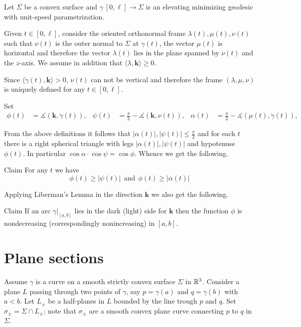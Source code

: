 \documentclass[a4paper,10pt]{amsart}
\begin{document}
Let $\Sigma$ be a convex surface 
and $\gamma\:[0,\ell]\to \Sigma$ is an elevating minimizing geodesic 
with unit-speed parametrization.

Given $t\in [0,\ell]$, 
consider the oriented orthonormal frame $\lambda(t),\mu(t),\nu(t)$ 
such that $\nu(t)$ is the outer normal to $\Sigma$ at $\gamma(t)$,
the vector $\mu(t)$ is horizontal and therefore the vector $\lambda(t)$ lies in the plane spanned by $\nu(t)$ and the $z$-axis.
We assume in addition that $\langle\lambda,\bm{k}\rangle\ge 0$.

Since $\langle\dot\gamma(t),\bm{k}\rangle>0$, 
$\nu(t)$ can not be vertical 
and therefore the frame $(\lambda,\mu,\nu)$ is uniquely defined for any $t\in[0,\ell]$.

Set 
\begin{align*}
\phi(t)&=\measuredangle(\bm{k},\dot\gamma(t)),&
\psi(t)&=\tfrac\pi2-\measuredangle(\bm{k},\nu(t)),&
\alpha(t)&=\tfrac\pi2-\measuredangle(\mu(t),\dot\gamma(t)),
\end{align*}

From the above definitions it follows that $|\alpha(t)|,|\psi(t)|\le \tfrac\pi2$ and for each $t$ there is a right spherical triangle with legs $|\alpha(t)|,|\psi(t)|$ and hypotenuse $\phi(t)$.
In particular $\cos\alpha\cdot\cos\psi=\cos\phi$.
Whence we get the following.

\begin{thm}{Claim}
For any $t$ we have 
\[
\phi(t)\ge |\psi(t)|\ \ \text{and}\ \ \phi(t)\ge |\alpha(t)|
\]

\end{thm}

Applying Liberman's Lemma in the direction $\bm{k}$ we also get the following.

\begin{thm}{Claim}
If an arc $\gamma|_{[a,b]}$ lies in the dark (light) side for $\bm{k}$ then 
the function $\phi$ is nondecreasing (correspondingly nonincreasing)
in $[a,b]$.
\end{thm}

\section{Plane sections}

Assume $\gamma$ is a curve on a smooth strictly convex surface $\Sigma$ in $\mathbb{R}^3$.
Consider a plane $L$ 
passing through two points of $\gamma$, 
say $p=\gamma(a)$ and $q=\gamma(b)$ with $a<b$.
Let $L_\pm$ be a  half-planes in $L$ bounded by the line trough $p$ and $q$.
Set $\sigma_\pm=\Sigma\cap L_\pm$;
note that $\sigma_\pm$ are a smooth convex plane curve connecting $p$ to $q$ in $\Sigma$.
\end{document}

